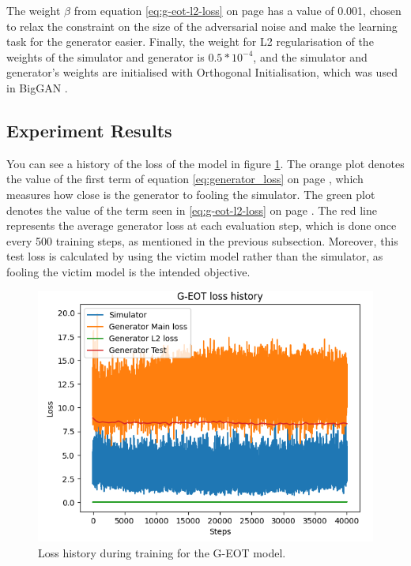 The weight $\beta$ from equation \ref{eq:g-eot-l2-loss} on page \pageref{eq:g-eot-l2-loss} has a value of 0.001, chosen to relax the constraint on the size of the adversarial noise and make the learning task for the generator easier. Finally, the weight for L2 regularisation of the weights of the simulator and generator is $0.5 * 10^{-4}$, and the simulator and generator's weights are initialised with Orthogonal Initialisation, which was used in BigGAN \cite{big_gan}.

\subsection{Experiment Results}
    \label{sec:experiment_design}
    
You can see a history of the loss of the model in figure \ref{fig:g_eot_loss_history}. The orange plot denotes the value of the first term of equation \ref{eq:generator_loss} on page \pageref{eq:generator_loss}, which measures how close is the generator to fooling the simulator. The green plot denotes the value of the term seen in \ref{eq:g-eot-l2-loss} on page \pageref{eq:g-eot-l2-loss}. The red line represents the average generator loss at each evaluation step, which is done once every 500 training steps, as mentioned in the previous subsection. Moreover, this test loss is calculated by using the victim model rather than the simulator, as fooling the victim model is the intended objective.
    
\begin{figure}[H]
    \centering
    \includegraphics[width=1\textwidth]{graphics/g-eot-loss-history.PNG}
    \caption{Loss history during training for the G-EOT model.}
    \label{fig:g_eot_loss_history}
\end{figure}

